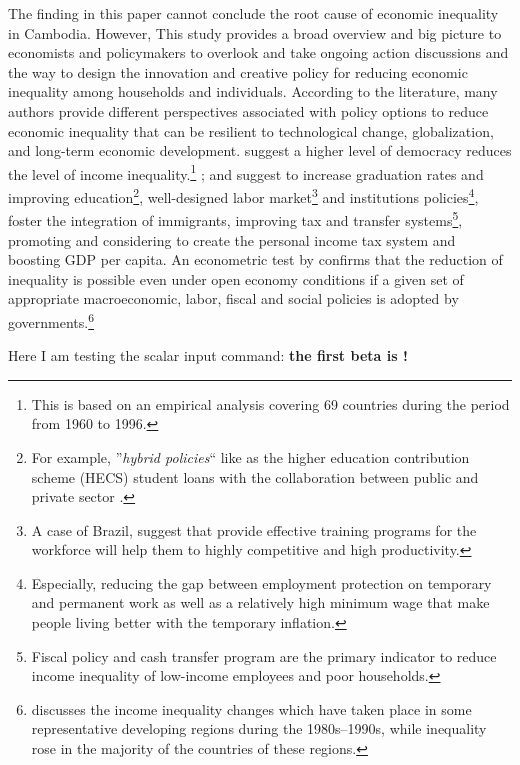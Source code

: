 \documentclass[11pt]{article}
\newcommand*{\TablesPath}{./tables/} %
\newcommand{\scalarinput}[1]{\DTLfetch{scalars}{thekey}{#1}{thevalue}}
\begin{document}
The finding in this paper cannot conclude the root cause of economic inequality in Cambodia. However, This study provides a broad overview and big picture to economists and policymakers to overlook and take ongoing action discussions and the way to design the innovation and creative policy for reducing economic inequality among households and individuals. According to the literature, many authors provide different perspectives associated with policy options to reduce economic inequality that can be resilient to technological change, globalization, and long-term economic development. \citet{Herran2005} suggest a higher level of democracy reduces the level of income inequality.\footnote{This is based on an empirical analysis covering 69 countries during the period from 1960 to 1996.} \citet{Bastagli2012, Breunig2019}; and \citet{Bastagli2012} suggest to increase graduation rates and improving education\footnote{For example, ''\textit{hybrid policies}`` like as the higher education contribution scheme (HECS) student loans with the collaboration between public and private sector \cite{Breunig2019}.}, well-designed labor market\footnote{A case of Brazil, \citet{Herran2005} suggest that provide effective training programs for the workforce will help them to highly competitive and high productivity.} and institutions policies\footnote{Especially, reducing the gap between employment protection on temporary and permanent work as well as a relatively high minimum wage that make people living better with the temporary inflation.}, foster the integration of immigrants, improving tax and transfer systems\footnote{Fiscal policy and cash transfer program are the primary indicator to reduce income inequality of low-income employees and poor households.}, promoting and considering to create the personal income tax system and boosting GDP per capita. An econometric test by \citet{GIZ2015} confirms that the reduction of inequality is possible even under open economy conditions if a given set of appropriate macroeconomic, labor, fiscal and social policies is adopted by governments.\footnote{\citet{GIZ2015} discusses the income inequality changes which have taken place in some representative developing regions during the 1980s--1990s, while inequality rose in the majority of the countries of these regions.}

Here I am testing the scalar input command: \textbf{the first beta is \scalarinput{first.value.beta}!}

\lipsum[3]


\end{document}
